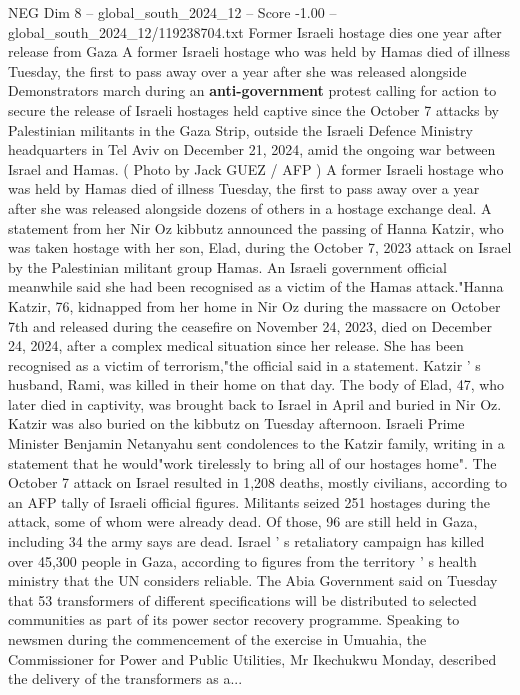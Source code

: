 \begin{textsample}{NEG Dim 8 – global\_south\_2024\_12 – Score -1.00 – global\_south\_2024\_12/119238704.txt}  \label{ex:f8_neg_387}
Former Israeli hostage dies one year after release from Gaza A former Israeli hostage who was held by Hamas died of illness Tuesday, the first to pass away over a year after she was released alongside Demonstrators march during an \textbf{anti-government} protest calling for action to secure the release of Israeli hostages held captive since the October 7 attacks by Palestinian militants in the Gaza Strip, outside the Israeli Defence Ministry headquarters in Tel Aviv on December 21, 2024, amid the ongoing war between Israel and Hamas. ( Photo by Jack GUEZ / AFP ) A former Israeli hostage who was held by Hamas died of illness Tuesday, the first to pass away over a year after she was released alongside dozens of others in a hostage exchange deal.
A statement from her Nir Oz kibbutz announced the passing of Hanna Katzir, who was taken hostage with her son, Elad, during the October 7, 2023 attack on Israel by the Palestinian militant group Hamas.
An Israeli government official meanwhile said she had been recognised as a victim of the Hamas attack."Hanna Katzir, 76, kidnapped from her home in Nir Oz during the massacre on October 7th and released during the ceasefire on November 24, 2023, died on December 24, 2024, after a complex medical situation since her release.
She has been recognised as a victim of terrorism,"the official said in a statement.
Katzir ' s husband, Rami, was killed in their home on that day.
The body of Elad, 47, who later died in captivity, was brought back to Israel in April and buried in Nir Oz.
Katzir was also buried on the kibbutz on Tuesday afternoon.
Israeli Prime Minister Benjamin Netanyahu sent condolences to the Katzir family, writing in a statement that he would"work tirelessly to bring all of our hostages home".
The October 7 attack on Israel resulted in 1,208 deaths, mostly civilians, according to an AFP tally of Israeli official figures.
Militants seized 251 hostages during the attack, some of whom were already dead.
Of those, 96 are still held in Gaza, including 34 the army says are dead.
Israel ' s retaliatory campaign has killed over 45,300 people in Gaza, according to figures from the territory ' s health ministry that the UN considers reliable.
The Abia Government said on Tuesday that 53 transformers of different specifications will be distributed to selected communities as part of its power sector recovery programme.
Speaking to newsmen during the commencement of the exercise in Umuahia, the Commissioner for Power and Public Utilities, Mr Ikechukwu Monday, described the delivery of the transformers as a...

\end{textsample}
